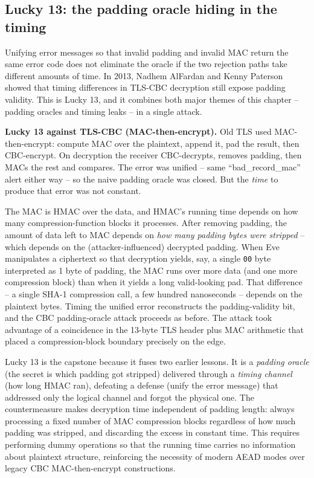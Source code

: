 \subsection{Lucky 13: the padding oracle hiding in the timing}
\label{ch37:lucky13}

Unifying error messages so that invalid padding and invalid MAC return the same error code does not eliminate the oracle if the two rejection paths take different amounts of time. In 2013, Nadhem AlFardan and Kenny Paterson showed that timing differences in TLS-CBC decryption still expose padding validity. This is Lucky 13, and it combines both major themes of this chapter -- padding oracles and timing leaks -- in a single attack.

\begin{attackbox}
\textbf{Lucky 13 against TLS-CBC (MAC-then-encrypt).} Old TLS used MAC-then-encrypt: compute $\text{MAC}$ over the plaintext, append it, pad the result, then CBC-encrypt. On decryption the receiver CBC-decrypts, removes padding, then MACs the rest and compares. The error was unified -- same ``bad\_record\_mac'' alert either way -- so the naive padding oracle was closed. But the \emph{time} to produce that error was not constant.

The MAC is HMAC over the data, and HMAC's running time depends on how many compression-function blocks it processes. After removing padding, the amount of data left to MAC depends on \emph{how many padding bytes were stripped} -- which depends on the (attacker-influenced) decrypted padding. When Eve manipulates a ciphertext so that decryption yields, say, a single \texttt{00} byte interpreted as 1 byte of padding, the MAC runs over more data (and one more compression block) than when it yields a long valid-looking pad. That difference -- a single SHA-1 compression call, a few hundred nanoseconds -- depends on the plaintext bytes. Timing the unified error reconstructs the padding-validity bit, and the CBC padding-oracle attack proceeds as before. The attack took advantage of a coincidence in the 13-byte TLS header plus MAC arithmetic that placed a compression-block boundary precisely on the edge.
\end{attackbox}


\begin{whybox}
Lucky 13 is the capstone because it fuses two earlier lessons. It is a \emph{padding oracle} (the secret is which padding got stripped) delivered through a \emph{timing channel} (how long HMAC ran), defeating a defense (unify the error message) that addressed only the logical channel and forgot the physical one. The countermeasure makes decryption time independent of padding length: always processing a fixed number of MAC compression blocks regardless of how much padding was stripped, and discarding the excess in constant time. This requires performing dummy operations so that the running time carries no information about plaintext structure, reinforcing the necessity of modern AEAD modes over legacy CBC MAC-then-encrypt constructions.
\end{whybox}

